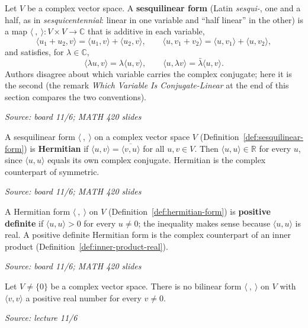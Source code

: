 \documentclass[11pt]{report}
\newcommand{\srcline}[1]{\par\hfill{\footnotesize\textit{Source: #1}}}
\begin{document}
\begin{defbox}\label{def:sesquilinear-form}
Let $V$ be a complex vector space. A \textbf{sesquilinear form} (Latin \emph{sesqui-}, one and a half, as in \emph{sesquicentennial}: linear in one variable and ``half linear'' in the other) is a map $\langle\ ,\ \rangle: V \times V \to \mathbb{C}$ that is additive in each variable,
\[ \langle u_1 + u_2, v \rangle = \langle u_1, v \rangle + \langle u_2, v \rangle, \qquad \langle u, v_1 + v_2 \rangle = \langle u, v_1 \rangle + \langle u, v_2 \rangle, \]
and satisfies, for $\lambda \in \mathbb{C}$,
\[ \langle \lambda u, v \rangle = \lambda \langle u, v \rangle, \qquad \langle u, \lambda v \rangle = \bar\lambda \langle u, v \rangle. \]
Authors disagree about which variable carries the complex conjugate; here it is the second (the remark \emph{Which Variable Is Conjugate-Linear} at the end of this section compares the two conventions).
\srcline{board 11/6; MATH 420 slides}
\end{defbox}

\begin{defbox}\label{def:hermitian-form}
A sesquilinear form $\langle\ ,\ \rangle$ on a complex vector space $V$ (Definition~\ref{def:sesquilinear-form}) is \textbf{Hermitian} if $\langle u, v \rangle = \overline{\langle v, u \rangle}$ for all $u, v \in V$. Then $\langle u, u \rangle \in \mathbb{R}$ for every $u$, since $\langle u, u \rangle$ equals its own complex conjugate. Hermitian is the complex counterpart of symmetric.
\srcline{board 11/6; MATH 420 slides}
\end{defbox}

\begin{defbox}\label{def:positive-definite-hermitian}
A Hermitian form $\langle\ ,\ \rangle$ on $V$ (Definition~\ref{def:hermitian-form}) is \textbf{positive definite} if $\langle u, u \rangle > 0$ for every $u \neq 0$; the inequality makes sense because $\langle u, u \rangle$ is real. A positive definite Hermitian form is the complex counterpart of an inner product (Definition~\ref{def:inner-product-real}).
\srcline{board 11/6; MATH 420 slides}
\end{defbox}

\begin{lembox}\label{lem:no-positive-definite-complex-bilinear}
Let $V \neq \{0\}$ be a complex vector space. There is no bilinear form $\langle\ ,\ \rangle$ on $V$ with $\langle v, v \rangle$ a positive real number for every $v \neq 0$.
\srcline{lecture 11/6}
\end{lembox}
\end{document}
